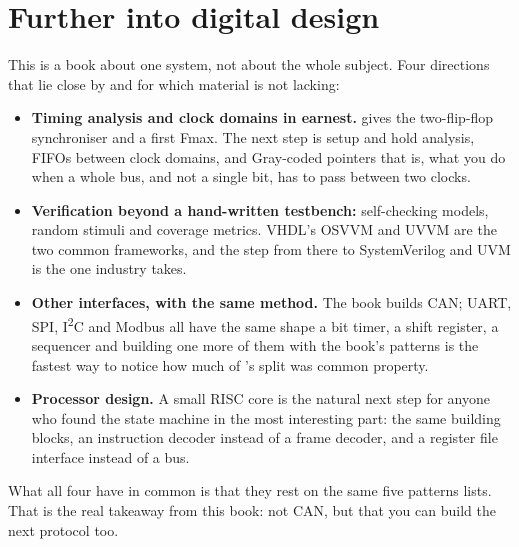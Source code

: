\section{Further into digital design}
\label{app:reading:design}

This is a book about one system, not about the whole subject. Four directions that lie close by and
for which material is not lacking:

\begin{itemize}
  \item \textbf{Timing analysis and clock domains in earnest.}  gives the
    two-flip-flop synchroniser and  a first Fmax. The next step is setup and hold
    analysis, FIFOs between clock domains, and Gray-coded pointers \textemdash{} that is, what you do
    when a whole bus, and not a single bit, has to pass between two clocks.
  \item \textbf{Verification beyond a hand-written testbench:} self-checking models, random stimuli
    and coverage metrics. VHDL's OSVVM and UVVM are the two common frameworks, and the step from
    there to SystemVerilog and UVM is the one industry takes.
  \item \textbf{Other interfaces, with the same method.} The book builds CAN; UART, SPI,
    I\textsuperscript{2}C and Modbus all have the same shape \textemdash{} a bit timer, a shift
    register, a sequencer \textemdash{} and building one more of them with the book's patterns is the
    fastest way to notice how much of 's split was common property.
  \item \textbf{Processor design.} A small RISC core is the natural next step for anyone who found the
    state machine in  the most interesting part: the same building blocks, an
    instruction decoder instead of a frame decoder, and a register file interface instead of a bus.
\end{itemize}

What all four have in common is that they rest on the same five patterns  lists. That
is the real takeaway from this book: not CAN, but that you can build the next protocol too.
